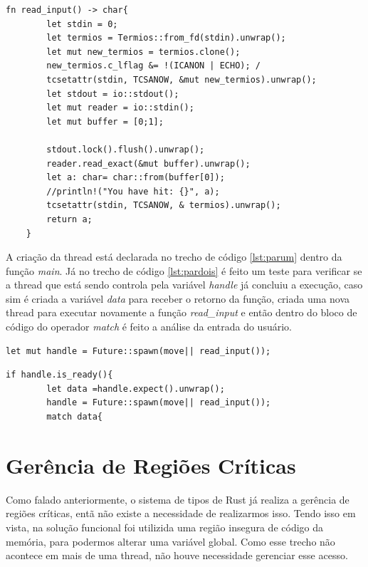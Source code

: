 \documentclass[rel_mlp]{iiufrgs}
\begin{document}
 \begin{lstlisting}[frame=single, label={lst:readinput},caption={Função read\_input}]
    fn read_input() -> char{
        let stdin = 0; 
        let termios = Termios::from_fd(stdin).unwrap();
        let mut new_termios = termios.clone();  
        new_termios.c_lflag &= !(ICANON | ECHO); /
        tcsetattr(stdin, TCSANOW, &mut new_termios).unwrap();
        let stdout = io::stdout();
        let mut reader = io::stdin();
        let mut buffer = [0;1];
        
        stdout.lock().flush().unwrap();
        reader.read_exact(&mut buffer).unwrap();
        let a: char= char::from(buffer[0]);
        //println!("You have hit: {}", a);
        tcsetattr(stdin, TCSANOW, & termios).unwrap();  
        return a;
    }
 \end{lstlisting}
 
 A criação da thread está declarada no trecho de código \ref{lst:parum} dentro da função \textit{main}. Já no trecho de código \ref{lst:pardois} é feito um teste para verificar se a thread que está sendo controla pela variável \textit{handle} já concluiu a execução, caso sim é criada a variável \textit{data} para receber o retorno da função, criada uma nova thread para executar novamente a função \textit{read_input} e então dentro do bloco de código do operador \textit{match} é feito a análise da entrada do usuário. 
 
 \begin{lstlisting}[frame = single, label = {lst:parum},caption={Criação da thread}]
     let mut handle = Future::spawn(move|| read_input());

 \end{lstlisting}
 \begin{lstlisting}[frame=single,label={lst:pardois},caption={Retorno da thread}]
    if handle.is_ready(){
        let data =handle.expect().unwrap();
        handle = Future::spawn(move|| read_input());
        match data{
 \end{lstlisting}
 
 \section{Gerência de Regiões Críticas}
Como falado anteriormente, o sistema de tipos de Rust já realiza a gerência de regiões críticas, entã não existe a necessidade de realizarmos isso. Tendo isso em vista, na solução funcional foi utilizida uma região insegura de código da memória, para podermos alterar uma variável global. Como esse trecho não acontece em mais de uma thread, não houve necessidade gerenciar esse acesso.
\end{document}
